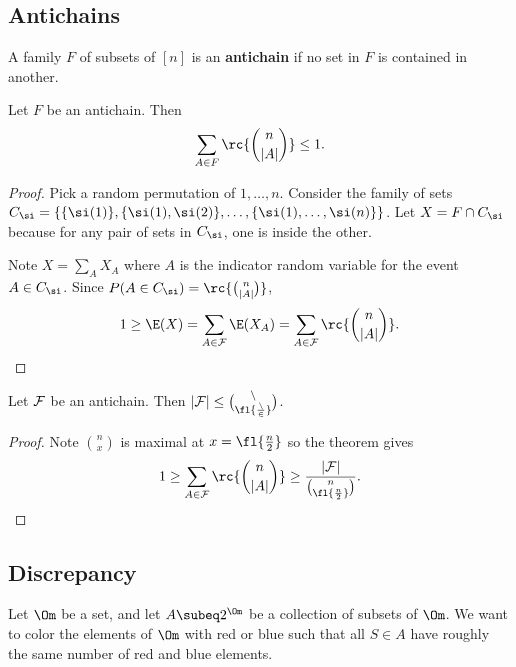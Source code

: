 \subsection{Antichains}
\begin{df}
A family $F$ of subsets of $[n]$ is an \textbf{antichain} if no set in $F$ is contained in another.
\end{df}
\begin{thm}
Let $F$ be an antichain. Then
\[\sum_{A\in F}\rc{\binom{n}{|A|}}\le 1.\]
\end{thm}
\begin{proof}
Pick a random permutation of $1,\ldots, n$. Consider the family of sets $C_{\si}=\{\{\si(1)\},\{\si(1),\si(2)\},\ldots, \{\si(1),\ldots,\si(n)\}\}$. Let $X=F\cap C_{\si}$ because for any pair of sets in $C_{\si}$, one is inside the other.

Note $X=\sum_{A} X_A$ where $A$ is the indicator random variable for the event $A\in C_{\si}$. Since $P(A\in C_{\si})=\rc{\binom n{|A|}}$, 
\[
1\ge \E(X)=\sum_{A\in \cal F} \E(X_A)=\sum_{A\in \cal F}\rc{\binom n{|A|}}.
\]
\end{proof}
\begin{cor}
Let $\cal F$ be an antichain. Then $|\cal F|\le \binom n{\fl{\frac n2}}$.
\end{cor}
\begin{proof}
Note $\binom nx$ is maximal at $x=\fl{\frac n2}$ so the theorem gives
\[
1\ge \sum_{A\in \cal F} \rc{\binom{n}{|A|}}\ge \frac{|\cal F|}{\binom{n}{\fl{\frac n2}}}.
\]
\end{proof}
\subsection{Discrepancy}
Let $\Om$ be a set, and let $A\subeq 2^{\Om}$ be a collection of subsets of $\Om$. We want to color the elements of $\Om$ with red or blue such that all $S\in A$ have roughly the same number of red and blue elements.

